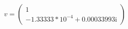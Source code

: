 \documentclass[preview]{standalone}
\begin{document}
\begin{center}
\raggedright
                \(v = \begin{pmatrix}
                                1 \\
                                -1.33333 * 10^{-4} + 0.00033993\mathrm{i}
                            \end{pmatrix}\)
\end{center}
\end{document}
